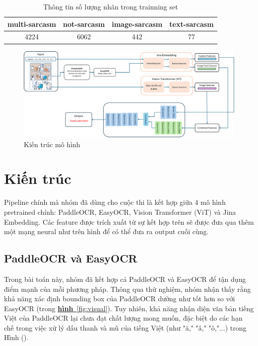 \documentclass[11pt]{article}
\begin{document}
\begin{table}[h!]
\centering

\small\begin{tabular}{|cccc|}
\hline
\textbf{multi-sarcasm}  & \textbf{not-sarcasm} & \textbf{image-sarcasm} & \textbf{text-sarcasm}\\ \hline
4224 & 6062 & 442 & 77\\
\hline
\end{tabular}
\caption{Thông tin số lượng nhãn trong trainning set}
\label{table:dataset-train}
\end{table}



\begin{figure}[t]
\centering
\includegraphics[width=1.0\linewidth]{Model_architecture.png}
\caption{Kiến trúc mô hình}
\label{fig:example}
\end{figure}

\FloatBarrier %
\section{Kiến trúc}
\hspace*{5mm} Pipeline chính mà nhóm đã dùng cho cuộc thi là kết hợp giữa 4 mô hình pretrained chính: PaddleOCR\cite{paddleocr2020}, EasyOCR\cite{easyocr}, Vision Transformer (ViT)\cite{vit1, vit2} và  Jina Embedding\cite{jinai}. Các feature được trích xuất từ sự kết hợp trên sẽ được đưa qua thêm một mạng neural như trên hình để có thể đưa ra output cuối cùng.
\subsection{PaddleOCR và EasyOCR}
\hspace*{5mm} Trong bài toán này, nhóm đã kết hợp cả PaddleOCR và EasyOCR để tận dụng điểm mạnh của mỗi phương pháp. Thông qua thử nghiệm, nhóm nhận thấy rằng khả năng xác định bounding box của PaddleOCR dường như tốt hơn so với EasyOCR (trong \hyperref[fig:visual]{\textbf{hình}~\ref*{fig:visual}}). Tuy nhiên, khả năng nhận diện văn bản tiếng Việt của PaddleOCR lại chưa đạt chất lượng mong muốn, đặc biệt do các hạn chế trong việc xử lý dấu thanh và mũ của tiếng Việt (như "ă," "â," "ô,"...) trong Hình ().
\end{document}

